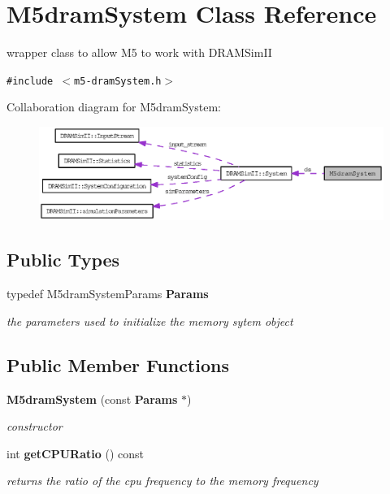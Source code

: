 \section{M5dramSystem Class Reference}
\label{class_m5dram_system}
wrapper class to allow M5 to work with DRAMSimII  


{\tt \#include $<$m5-dramSystem.h$>$}

Collaboration diagram for M5dramSystem:\nopagebreak
\begin{figure}[H]
\begin{center}
\leavevmode
\includegraphics[width=400pt]{class_m5dram_system__coll__graph}
\end{center}
\end{figure}
\subsection*{Public Types}
\begin{CompactItemize}
\item 
typedef M5dramSystemParams {\bf Params}\label{class_m5dram_system_bc049789b7ba009ac06888952383d456}

\begin{CompactList}\small\item\em the parameters used to initialize the memory sytem object \item\end{CompactList}\end{CompactItemize}
\subsection*{Public Member Functions}
\begin{CompactItemize}
\item 
{\bf M5dramSystem} (const {\bf Params} $\ast$)\label{class_m5dram_system_84fc057ba92f2b4259bb6e48dfda6e67}

\begin{CompactList}\small\item\em constructor \item\end{CompactList}\item 
int {\bf getCPURatio} () const \label{class_m5dram_system_1525d7f1a5251189661baf1ba2ae67c6}

\begin{CompactList}\small\item\em returns the ratio of the cpu frequency to the memory frequency \item\end{CompactList}\end{CompactItemize}
